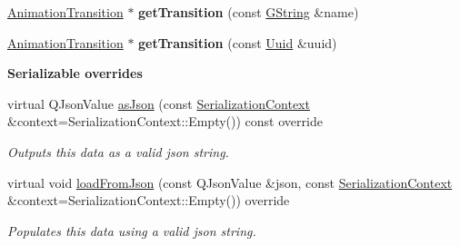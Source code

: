 \begin{Indent}
\begin{DoxyCompactItemize}
\mbox{\hyperlink{classrev_1_1_animation_transition}{Animation\+Transition}} $\ast$ {\bfseries get\+Transition} (const \mbox{\hyperlink{classrev_1_1_g_string}{G\+String}} \&name)
\item 
\mbox{\label{classrev_1_1_animation_state_machine_a7c5add4ed07692513c9ac90e26c98a89}} 
\mbox{\hyperlink{classrev_1_1_animation_transition}{Animation\+Transition}} $\ast$ {\bfseries get\+Transition} (const \mbox{\hyperlink{classrev_1_1_uuid}{Uuid}} \&uuid)
\end{DoxyCompactItemize}
\end{Indent}
\begin{Indent}\textbf{ Serializable overrides}\par
\begin{DoxyCompactItemize}
\item 
\mbox{\label{classrev_1_1_animation_state_machine_a220321e89f33f66a6c4935d4a91e819b}} 
virtual Q\+Json\+Value \mbox{\hyperlink{classrev_1_1_animation_state_machine_a220321e89f33f66a6c4935d4a91e819b}{as\+Json}} (const \mbox{\hyperlink{structrev_1_1_serialization_context}{Serialization\+Context}} \&context=Serialization\+Context\+::\+Empty()) const override
\begin{DoxyCompactList}\small\item\em Outputs this data as a valid json string. \end{DoxyCompactList}\item 
\mbox{\label{classrev_1_1_animation_state_machine_a52e2006d173e67787b12d7b1732e5217}} 
virtual void \mbox{\hyperlink{classrev_1_1_animation_state_machine_a52e2006d173e67787b12d7b1732e5217}{load\+From\+Json}} (const Q\+Json\+Value \&json, const \mbox{\hyperlink{structrev_1_1_serialization_context}{Serialization\+Context}} \&context=Serialization\+Context\+::\+Empty()) override
\begin{DoxyCompactList}\small\item\em Populates this data using a valid json string. \end{DoxyCompactList}\end{DoxyCompactItemize}
\end{Indent}
